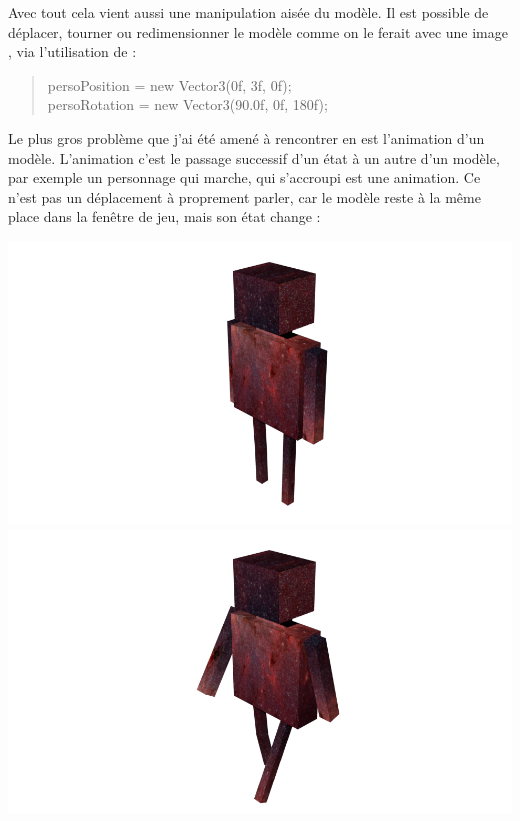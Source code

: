 \documentclass{article}
\begin{document}
Avec tout cela vient aussi une manipulation aisée du modèle. Il est possible de déplacer, tourner ou redimensionner le modèle  comme on le ferait avec une image , via l'utilisation de  : 
\begin{quote}
persoPosition = new Vector3(0f, 3f, 0f);\\
persoRotation = new Vector3(90.0f, 0f, 180f);
\end{quote}

Le plus gros problème que j'ai été amené à rencontrer en  est l'animation d'un modèle. L'animation c'est le passage successif d'un état à un autre d'un modèle, par exemple un personnage qui marche, qui s'accroupi est une animation. Ce n'est pas un déplacement à proprement parler, car le modèle  reste à la même place dans la fenêtre de jeu, mais son état change : 

 \begin{center}
\includegraphics[scale=0.5]{static}
\includegraphics[scale=0.5]{MARCHE}
\end{center}
\end{document}
